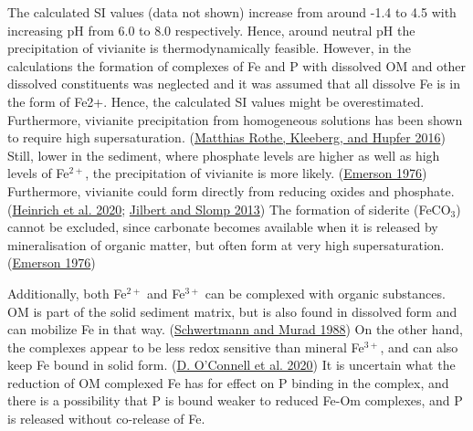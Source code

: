 \documentclass[a4paper,11pt]{article}
\begin{document}
The calculated SI values (data not shown) increase from around -1.4 to 4.5 with increasing pH from 6.0 to 8.0 respectively. Hence, around neutral pH the precipitation of vivianite is thermodynamically feasible. However, in the calculations the formation of complexes of Fe and P with dissolved OM and other dissolved constituents was neglected and it was assumed that all dissolve Fe is in the form of Fe2+. Hence, the calculated SI values might be overestimated. Furthermore, vivianite precipitation from homogeneous solutions has been shown to require high supersaturation. (\protect\hyperlink{ref-rotheOccurrenceIdentificationEnvironmental2016}{Matthias Rothe, Kleeberg, and Hupfer 2016}) Still, lower in the sediment, where phosphate levels are higher as well as high levels of Fe\(^{2+}\), the precipitation of vivianite is more likely. (\protect\hyperlink{ref-emersonEarlyDiagenesisAnaerobic1976}{Emerson 1976}) Furthermore, vivianite could form directly from reducing oxides and phosphate. (\protect\hyperlink{ref-heinrichTransformationRedoxsensitiveRedoxstable2020}{Heinrich et al. 2020}; \protect\hyperlink{ref-jilbertIronManganeseShuttles2013}{Jilbert and Slomp 2013}) The formation of siderite (FeCO\(_3\)) cannot be excluded, since carbonate becomes available when it is released by mineralisation of organic matter, but often form at very high supersaturation. (\protect\hyperlink{ref-emersonEarlyDiagenesisAnaerobic1976}{Emerson 1976})

Additionally, both Fe\(^{2+}\) and Fe\(^{3+}\) can be complexed with organic substances. OM is part of the solid sediment matrix, but is also found in dissolved form and can mobilize Fe in that way. (\protect\hyperlink{ref-schwertmannNatureIronOxide1988}{Schwertmann and Murad 1988}) On the other hand, the complexes appear to be less redox sensitive than mineral Fe\(^{3+}\), and can also keep Fe bound in solid form. (\protect\hyperlink{ref-oconnellChangesSedimentaryPhosphorus2020}{D. O'Connell et al. 2020}) It is uncertain what the reduction of OM complexed Fe has for effect on P binding in the complex, and there is a possibility that P is bound weaker to reduced Fe-Om complexes, and P is released without co-release of Fe.
\end{document}
